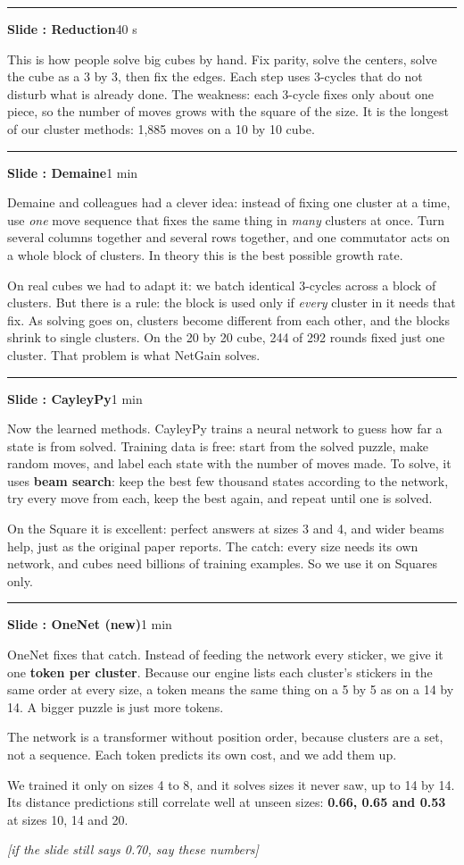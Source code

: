 \documentclass[11pt,a4paper]{article}
\newcounter{slide}
\newcommand{\slide}[2]{\par\bigskip\stepcounter{slide}%
  {\color{NavyBlue}\rule{\linewidth}{0.4pt}}\par
  \textbf{\large Slide \arabic{slide}: #1}\hfill{\small\color{gray}#2}\par}
\newcommand{\act}[1]{\par{\small\color{OliveGreen}\textit{[#1]}}\par}
\begin{document}
\slide{Reduction}{40 s}
This is how people solve big cubes by hand. Fix parity, solve the centers, solve the cube as a 3 by 3, then fix the edges.
Each step uses 3-cycles that do not disturb what is already done.
The weakness: each 3-cycle fixes only about one piece, so the number of moves grows with the square of the size. It is
the longest of our cluster methods: 1,885 moves on a 10 by 10 cube.

\slide{Demaine}{1 min}
Demaine and colleagues had a clever idea: instead of fixing one cluster at a time, use \emph{one} move sequence that fixes the
same thing in \emph{many} clusters at once. Turn several columns together and several rows together, and one commutator acts on
a whole block of clusters. In theory this is the best possible growth rate.

On real cubes we had to adapt it: we batch identical 3-cycles across a block of clusters. But there is a rule: the block is used
only if \emph{every} cluster in it needs that fix. As solving goes on, clusters become different from each other, and the blocks
shrink to single clusters. On the 20 by 20 cube, 244 of 292 rounds fixed just one cluster. That problem is what NetGain solves.

\slide{CayleyPy}{1 min}
Now the learned methods. CayleyPy trains a neural network to guess how far a state is from solved.
Training data is free: start from the solved puzzle, make random moves, and label each state with the number of moves made.
To solve, it uses \textbf{beam search}: keep the best few thousand states according to the network, try every move from each,
keep the best again, and repeat until one is solved.

On the Square it is excellent: perfect answers at sizes 3 and 4, and wider beams help, just as the original paper reports.
The catch: every size needs its own network, and cubes need billions of training examples. So we use it on Squares only.

\slide{OneNet (new)}{1 min}
OneNet fixes that catch. Instead of feeding the network every sticker, we give it one \textbf{token per cluster}.
Because our engine lists each cluster's stickers in the same order at every size, a token means the same thing on a 5 by 5 as
on a 14 by 14. A bigger puzzle is just more tokens.

The network is a transformer without position order, because clusters are a set, not a sequence. Each token predicts its own
cost, and we add them up.

We trained it only on sizes 4 to 8, and it solves sizes it never saw, up to 14 by 14. Its distance predictions still correlate
well at unseen sizes: \textbf{0.66, 0.65 and 0.53} at sizes 10, 14 and 20. \act{if the slide still says 0.70, say these numbers}
\end{document}
